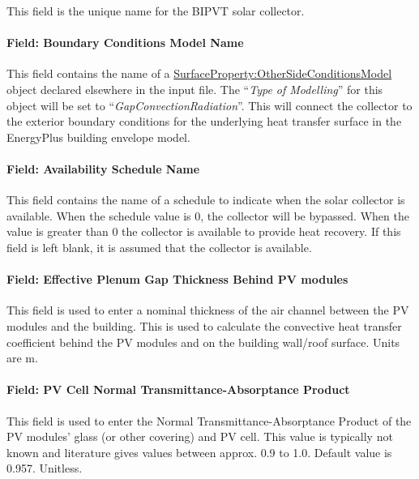 This field is the unique name for the BIPVT solar collector.

\paragraph{Field: Boundary Conditions Model Name}\label{BIPVT-field-BC}

This field contains the name of a \hyperref[surfacepropertyothersideconditionsmodel]{SurfaceProperty:OtherSideConditionsModel} object declared elsewhere in the input file. The “\textit{Type of Modelling}” for this object will be set to “\textit{GapConvectionRadiation}”. This will connect the collector to the exterior boundary conditions for the underlying heat transfer surface in the EnergyPlus building envelope model.

\paragraph{Field: Availability Schedule Name}\label{BIPVT-field-Sched}

This field contains the name of a schedule to indicate when the solar collector is available. When the schedule value is 0, the collector will be bypassed. When the value is greater than 0 the collector is available to provide heat recovery. If this field is left blank, it is assumed that the collector is available.

\paragraph{Field: Effective Plenum Gap Thickness Behind PV modules}\label{BIPVT-field-Gap}

This field is used to enter a nominal thickness of the air channel between the PV modules and the building. This is used to calculate the convective heat transfer coefficient behind the PV modules and on the building wall/roof surface. Units are \si{\m}. 

\paragraph{Field: PV Cell Normal Transmittance-Absorptance Product}\label{BIPVT-field-PVcell-tau-alpha}

This field is used to enter the Normal Transmittance-Absorptance Product of the PV modules' glass (or other covering) and PV cell. This value is typically not known and literature gives values between approx. 0.9 to 1.0. Default value is 0.957. Unitless.

